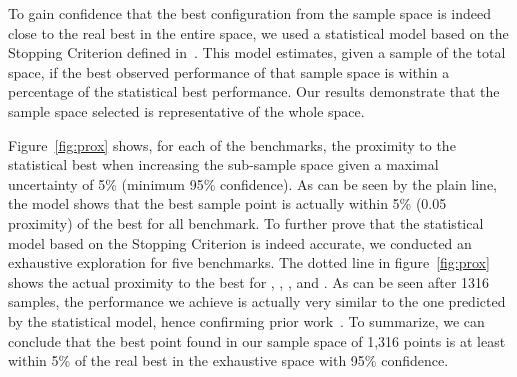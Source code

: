 To gain confidence that the best configuration from the sample space is indeed close to the real best in the entire space, we used a statistical model based on the Stopping Criterion defined in~\cite{vuduc2003AutomaticPerf}.
This model estimates, given a sample of the total space, if the best observed performance of that sample space is within a percentage of the statistical best performance.
Our results demonstrate that the sample space selected is representative of the whole space.

Figure~\ref{fig:prox} shows, for each of the benchmarks, the proximity to the statistical best when increasing the sub-sample space given a maximal uncertainty of 5\%  (\ie minimum 95\% confidence).
As can be seen by the plain line, the model shows that the best sample point is actually within 5\% (0.05 proximity) of the best for all benchmark.
To further prove that the statistical model based on the Stopping Criterion is indeed accurate, we conducted an exhaustive exploration for five benchmarks.
The dotted line in figure~\ref{fig:prox} shows the actual proximity to the best for , , ,  and .
As can be seen after 1316 samples, the performance we achieve is actually very similar to the one predicted by the statistical model, hence confirming prior work~\cite{vuduc2003AutomaticPerf}.
To summarize, we can conclude that the best point found in our sample space of 1,316 points is at least within 5\% of the real best in the exhaustive space with 95\% confidence.


